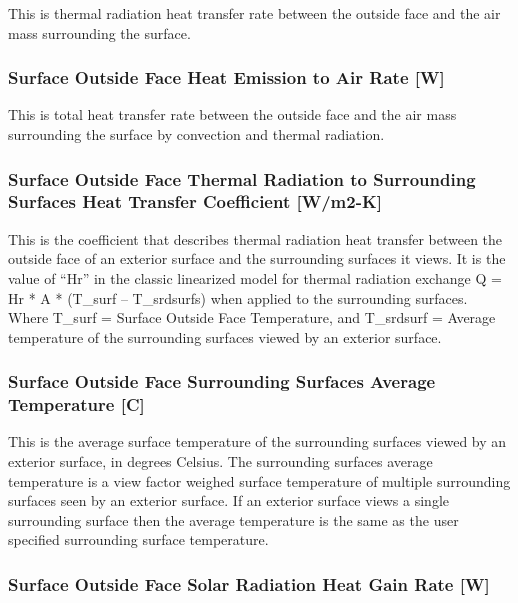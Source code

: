 This is thermal radiation heat transfer rate between the outside face and the air mass surrounding the surface.

\subsubsection{Surface Outside Face Heat Emission to Air Rate {[}W{]}}\label{surface-outside-face-heat-emission-to-air-heat-transfer-rate-w}

This is total heat transfer rate between the outside face and the air mass surrounding the surface by convection and thermal radiation.

\subsubsection{Surface Outside Face Thermal Radiation to Surrounding Surfaces Heat Transfer Coefficient {[}W/m2-K{]}}\label{surface-outside-face-thermal-radiation-to-surrounding-surfaces-heat-transfer-coefficient-wm2-k}

This is the coefficient that describes thermal radiation heat transfer between the outside face of an exterior surface and the surrounding surfaces it views. It is the value of ``Hr'' in the classic linearized model for thermal radiation exchange Q = Hr * A * (T\_surf -- T\_srdsurfs) when applied to the surrounding surfaces. Where T\_surf = Surface Outside Face Temperature, and T\_srdsurf = Average temperature of the surrounding surfaces viewed by an exterior surface.

\subsubsection{Surface Outside Face Surrounding Surfaces Average Temperature {[}C{]}}\label{surface-outside-face-surrounding-surfaces-average-temperature-C}

This is the average surface temperature of the surrounding surfaces viewed by an exterior surface, in degrees Celsius. The surrounding surfaces average temperature is a view factor weighed surface temperature of multiple surrounding surfaces seen by an exterior surface. If an exterior surface views a single surrounding surface then the average temperature is the same as the user specified surrounding surface temperature.

\subsubsection{Surface Outside Face Solar Radiation Heat Gain Rate {[}W{]}}\label{surface-outside-face-solar-radiation-heat-gain-rate-w}

